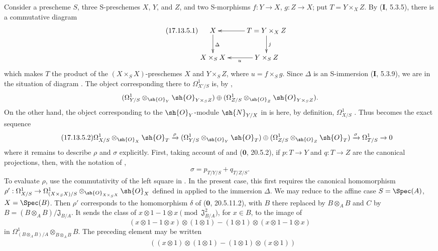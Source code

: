 \begin{env}[17.13.5]
\label{IV.17.13.5}
Consider a prescheme $S$, three S-preschemes $X$, $Y$, and $Z$, and two S-morphisms $f:Y\to X$, $g:Z\to X$; put $T=Y\times_XZ$.
By (\textbf{I}, 5.3.5), there is a commutative diagram
\[
\label{IV.17.13.5.1}
\tag{17.13.5.1}
\xymatrix{
  X \ar[d]^{\Delta} & T=Y\times_X Z \ar[l] \ar[d]^{j} \\
  X\times_S X & Y\times_S Z \ar[l]^{u}
}
\]
which makes $T$ the product of the $(X\times_SX)$-preschemes $X$ and $Y\times_SZ$, where $u=f\times_Sg$.
Since $\Delta$ is an S-immersion (\textbf{I}, 5.3.9), we are in the situation of diagram .
The object corresponding there to $\Omega^1_{X'/S}$ is, by ,
\[
  (\Omega^1_{Y/S}\otimes_{\sh{O}_Y}\sh{O}_{Y\times_SZ})
  \oplus
  (\Omega^1_{Z/S}\otimes_{\sh{O}_Z}\sh{O}_{Y\times_SZ}).
\]
On the other hand, the object corresponding to the $\sh{O}_Y$-module $\sh{N}_{Y/X}$ in  is here, by definition, $\Omega^1_{X/S}$ .
Thus  becomes the exact sequence
\[
\label{IV.17.13.5.2}
\tag{17.13.5.2}
\Omega^1_{X/S}\otimes_{\sh{O}_X}\sh{O}_T \xrightarrow{\rho}
(\Omega^1_{Y/S}\otimes_{\sh{O}_Y}\sh{O}_T)\oplus
(\Omega^1_{Z/S}\otimes_{\sh{O}_Z}\sh{O}_T)
\xrightarrow{\sigma} \Omega^1_{T/S} \to 0
\]
where it remains to describe $\rho$ and $\sigma$ explicitly.
First, taking account of  and ($\mathbf{0}$, 20.5.2), if $p:T\to Y$ and $q:T\to Z$ are the canonical projections, then, with the notation of ,
\[
\label{IV.17.13.5.3}
\tag{17.13.5.3}
\sigma = p_{T/Y/S} + q_{T/Z/S}.
\]
To evaluate $\rho$, use the commutativity of the left square in .
In the present case, this first requires the canonical homomorphism
$\rho': \Omega^1_{X/S} \to \Omega^1_{(X\times_S X)/S}\otimes_{\sh{O}_{X\times_S X}}\sh{O}_X$
defined in  applied to the immersion $\Delta$.
We may reduce to the affine case $S=\Spec(A)$, $X=\Spec(B)$.
Then $\rho'$ corresponds to the homomorphism $\delta$ of ($\mathbf{0}$, 20.5.11.2), with $B$ there replaced by $B\otimes_AB$ and $C$ by
$B=(B\otimes_AB)/\mathfrak J_{B/A}$.
It sends the class of
$x\otimes1-1\otimes x\pmod{\mathfrak J_{B/A}^2}$, for $x\in B$, to the image of
\[
  (x\otimes1-1\otimes x)\otimes(1\otimes1)
  -(1\otimes1)\otimes(x\otimes1-1\otimes x)
\]
in $\Omega^1_{(B\otimes_AB)/A}\otimes_{B\otimes_AB}B$.
The preceding element may be written
\[
\begin{split}
 &((x\otimes1)\otimes(1\otimes1)-(1\otimes1)\otimes(x\otimes1))\\

\end{split}\]
\end{env}
